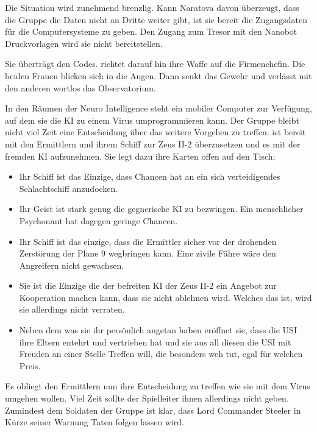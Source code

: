 Die Situation wird zunehmend brenzlig. Kann Naratova davon überzeugt, dass die Gruppe die Daten nicht an Dritte weiter gibt, ist sie bereit \ml{} die Zugangsdaten für die Computersysteme zu geben. Den Zugang zum Tresor mit den Nanobot Druckvorlagen wird sie nicht bereitstellen.


Sie überträgt \ml{} den Codes. \xl{} richtet darauf hin ihre Waffe auf die Firmenchefin. Die beiden Frauen blicken sich in die Augen. Dann senkt \xl{} das Gewehr und verlässt mit den anderen wortlos das Observatorium.

In den Räumen der Neuro Intelligence steht \ml{} ein mobiler Computer zur Verfügung, auf dem sie die KI zu einem Virus umprogrammieren kann. Der Gruppe bleibt nicht viel Zeit eine Entscheidung über das weitere Vorgehen zu treffen. \xl{} ist bereit mit den Ermittlern und ihrem Schiff zur Zeus II-2 überzusetzen und es mit der fremden KI aufzunehmen. Sie legt dazu ihre Karten offen auf den Tisch:

\begin{itemize}
	\item Ihr Schiff ist das Einzige, dass Chancen hat an ein sich verteidigendes Schlachtschiff anzudocken.
	\item Ihr Geist ist stark genug die gegnerische KI zu bezwingen. Ein menschlicher Psychonaut hat dagegen geringe Chancen.
	\item Ihr Schiff ist das einzige, dass die Ermittler sicher vor der drohenden Zerstörung der Plane 9 wegbringen kann. Eine zivile Fähre 
        wäre den Angreifern nicht gewachsen.
	\item Sie ist die Einzige die der befreiten KI der Zeus II-2 ein Angebot zur Kooperation machen kann, dass sie nicht ablehnen wird. 
		Welches das ist, wird sie allerdings nicht verraten.
    \item Neben dem was sie ihr persönlich angetan haben eröffnet sie, dass die USI ihre Eltern entehrt und vertrieben hat und sie aus all diesen die USI mit Freuden an einer Stelle Treffen will, die besonders weh tut, egal für welchen Preis.
\end{itemize}

Es obliegt den Ermittlern nun ihre Entscheidung zu treffen wie sie mit dem Virus umgehen wollen. Viel Zeit sollte der Spielleiter ihnen allerdings nicht geben. Zumindest dem Soldaten der Gruppe ist klar, dass Lord Commander Steeler in Kürze seiner Warnung Taten folgen lassen wird.

